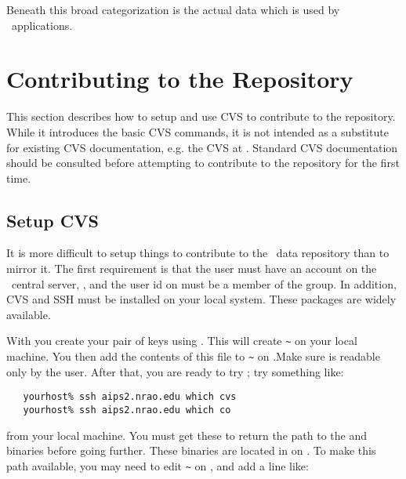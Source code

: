 \noindent
Beneath this broad categorization is the actual data which is used by
\aipspp\ applications.


\section{Contributing to the Repository}
\label{data repository contributing}

This section describes how to setup and use CVS to contribute to the repository.
While it introduces the basic CVS commands, it is not intended as a substitute
for existing CVS documentation, e.g. the CVS
at . Standard CVS documentation should be consulted before
attempting to contribute to the repository for the first time.

\subsection*{Setup CVS}
\label{data repository cvs setup}

It is more difficult to setup things to contribute to the \aipspp\ data
repository than to mirror it. The first requirement is that the user must
have an account on the \aipspp\ central server, , and
the user id on  must be a member of the 
group. In addition, CVS and SSH must be installed on your local system. These
packages are widely available.

With  you create your pair of keys using .
This will create \verb+~+ on your local machine. You
then add the contents of this file to \verb+~+
on .Make sure  is readable only by
the user. After that, you are ready to try ; try something like:

\begin{verbatim}
   yourhost% ssh aips2.nrao.edu which cvs
   yourhost% ssh aips2.nrao.edu which co
\end{verbatim}

\noindent
from your local machine. You must get these to return the path to the
 and  binaries before going further. These binaries
are located in  on . To make
this path available, you may need to edit \verb+~+ on
, and add a line like:

